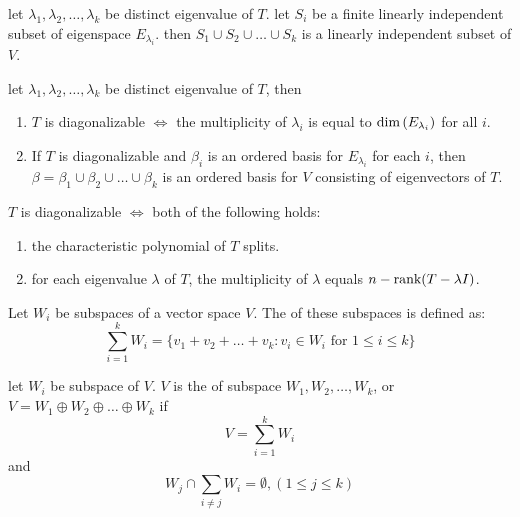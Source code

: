 \begin{theorem}
    let $\lambda_1, \lambda_2, \dots, \lambda_k$ be distinct eigenvalue of $T$. let $S_i$ be a finite linearly independent subset of eigenspace $E_{\lambda_i}$. then $S_1 \cup S_2 \cup \dots \cup S_k$ is a linearly independent subset of $V$.
\end{theorem}

\begin{theorem}
    let $\lambda_1, \lambda_2, \dots, \lambda_k$ be distinct eigenvalue of $T$, then
    \begin{enumerate}
        \item $T$ is diagonalizable $\iff$ the multiplicity of $\lambda_i$ is equal to $\displaystyle \text{dim}\left( E_{\lambda_i} \right)$ for all $i$.
        \item If $T$ is diagonalizable and $\beta_i$ is an ordered basis for $E_{\lambda_i}$ for each $i$, then $\beta = \beta_1 \cup \beta_2 \cup \dots \cup \beta_k$ is an ordered basis for $V$ consisting of eigenvectors of $T$.
    \end{enumerate}
\end{theorem}

\begin{theorem}
    $T$ is diagonalizable $\iff$ both of the following holds:
    \begin{enumerate}
        \item the characteristic polynomial of $T$ splits.
        \item for each eigenvalue $\lambda$ of $T$, the multiplicity of $\lambda$ equals $n - \displaystyle \text{rank}( T - \lambda I )$.
    \end{enumerate}
\end{theorem}

\begin{definition}
    Let $W_i$ be subspaces of a vector space $V$. The  of these subspaces is defined as:
    \begin{equation}
        \sum_{i=1}^k W_i = \{ v_1 + v_2 + \dots + v_k : v_i \in W_i \text{ for } 1 \leq i \leq k \}
    \end{equation}
\end{definition}

\begin{definition}
    let $W_i$ be subspace of $V$. $V$ is the  of subspace $W_1, W_2, \dots, W_k$, or $V = W_1 \oplus W_2 \oplus \dots \oplus W_k$ if
    \begin{equation*}
        V = \sum_{i=1}^k W_i
    \end{equation*}
    and 
    \begin{equation*}
        W_j \cap \sum_{i \neq j} W_i = \emptyset, (1 \leq j \leq k)
    \end{equation*}
\end{definition}

